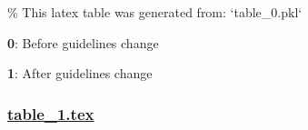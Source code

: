 \documentclass[11pt]{article}
\begin{document}
\begin{codeoutput}
\% This latex table was generated from: `table\_0.pkl`
\begin{table}[h]
\caption{Mean and Standard deviation of APGAR scores and SNAPPE II score, stratified by guidelines change}
\label{table:change\_in\_policy\_impact}
\begin{threeparttable}
\renewcommand{\TPTminimum}{\linewidth}
\begin{tablenotes}
\footnotesize
\item \textbf{0}: Before guidelines change
\item \textbf{1}: After guidelines change
\end{tablenotes}
\end{threeparttable}
\end{table}
\end{codeoutput}

\subsubsection*{\hyperlink{code-LaTeX Table Design-table-1-tex}{table\_1.tex}}
\end{document}
